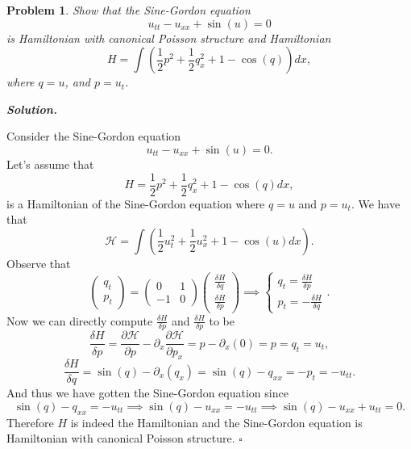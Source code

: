 \documentclass[12pt]{report}
\newtheorem{problem}{Problem}
\newenvironment{solution}[1][\it{Solution}]{\textbf{#1. } }{$\square$}
\newcommand{\pp}[2]{\frac{\partial #1}{\partial #2}} %
\begin{document}
\newpage



\begin{problem}
    Show that the Sine-Gordon equation
$$
u_{tt}-u_{xx}+\sin(u)=0
$$
is Hamiltonian with canonical Poisson structure and Hamiltonian
$$
H=\int \left(\frac{1}{2} p^2+\frac{1}{2}q_{x}^2+1-\cos(q)\right)dx,
$$
where $q=u$, and $p=u_t$.
\end{problem}

\begin{solution}

    \noindent
    Consider the Sine-Gordon equation
    \[ u_{tt} - u_{xx} + \sin(u) = 0.\]
    Let's assume that
    \[H = \frac{1}{2}p^2 + \frac{1}{2}q^2_x + 1 - \cos(q)dx,\]
    is a Hamiltonian of the Sine-Gordon equation where $q = u$ and $p = u_t$. We have that
    \[ \mathcal{H} = \int(\frac{1}{2}u_t^2 + \frac{1}{2}u^2_x + 1 - \cos(u)dx).\]
    Observe that
    \[ 
        \begin{pmatrix}
            q_t\\p_t
        \end{pmatrix} = \begin{pmatrix}
            0 & 1 \\ -1 & 0
        \end{pmatrix}\begin{pmatrix}
            \frac{\delta H}{\delta q}\\\frac{\delta H}{\delta p} 
        \end{pmatrix}\implies
        \begin{cases}
            q_t = \frac{\delta H}{\delta p}\\
            p_t = - \frac{\delta H}{\delta q}
        \end{cases}.
    \]
    Now we can directly compute $\frac{\delta H}{\delta p}$ and $\frac{\delta H}{\delta p}$ to be
    \[ 
        \frac{\delta H}{\delta p} = \pp{\mathcal{H}}{p} - \partial_x \pp{\mathcal{H}}{p_x} = p - \partial_x(0) = p = q_t = u_t,
    \]
    \[ 
        \frac{\delta H}{\delta q} = \sin(q) - \partial_x(q_x) = \sin(q) - q_{xx} = -p_t = -u_{tt}.
    \]
    And thus we have gotten the Sine-Gordon equation since 
    \[ 
       \sin(q) - q_{xx} = -u_{tt} \implies \sin(q) - u_{xx} = -u_{tt} \implies \sin(q) - u_{xx} + u_{tt} = 0.
    \]
    Therefore $H$ is indeed the Hamiltonian and the Sine-Gordon equation is Hamiltonian with canonical Poisson structure. 
\end{solution}
\end{document}
